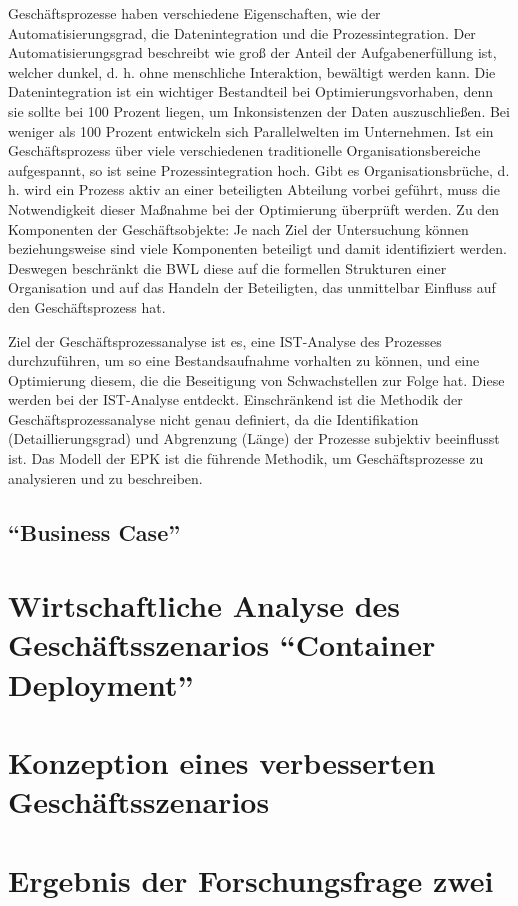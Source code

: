 Geschäftsprozesse haben verschiedene Eigenschaften, wie der Automatisierungsgrad, die Datenintegration und die Prozessintegration. Der Automatisierungsgrad beschreibt wie groß der Anteil der Aufgabenerfüllung ist, welcher dunkel, d. h. ohne menschliche Interaktion, bewältigt werden kann. Die Datenintegration ist ein wichtiger Bestandteil bei Optimierungsvorhaben, denn sie sollte bei 100 Prozent liegen, um Inkonsistenzen der Daten auszuschließen. Bei weniger als 100 Prozent entwickeln sich Parallelwelten im Unternehmen. Ist ein Geschäftsprozess über viele verschiedenen traditionelle Organisationsbereiche aufgespannt, so ist seine Prozessintegration hoch. Gibt es Organisationsbrüche, d. h. wird ein Prozess aktiv an einer beteiligten Abteilung vorbei geführt, muss die Notwendigkeit dieser Maßnahme bei der Optimierung überprüft werden. Zu den Komponenten der Geschäftsobjekte: Je nach Ziel der Untersuchung können beziehungsweise sind viele Komponenten beteiligt und damit identifiziert werden. Deswegen beschränkt die \ac{BWL} diese auf die formellen Strukturen einer Organisation und auf das Handeln der Beteiligten, das unmittelbar Einfluss auf den Geschäftsprozess hat.\autocite[vgl.][S.15]{staud_geschaftsprozessanalyse_2006} \par

Ziel der Geschäftsprozessanalyse ist es, eine IST-Analyse des Prozesses durchzuführen, um so eine Bestandsaufnahme vorhalten zu können, und eine Optimierung diesem, die die Beseitigung von Schwachstellen zur Folge hat. Diese werden bei der IST-Analyse entdeckt. Einschränkend ist die Methodik der Geschäftsprozessanalyse nicht genau definiert, da die Identifikation (Detaillierungsgrad) und Abgrenzung (Länge) der Prozesse subjektiv beeinflusst ist. Das Modell der \ac{EPK} ist die führende Methodik, um Geschäftsprozesse zu analysieren und zu beschreiben.\autocite[vgl.][S.59]{staud_geschaftsprozessanalyse_2006}
\subsection{\enquote{Business Case}}

\section{Wirtschaftliche Analyse des Geschäftsszenarios \enquote{Container Deployment}}

\section{Konzeption eines verbesserten Geschäftsszenarios}

\section{Ergebnis der Forschungsfrage zwei}
